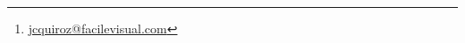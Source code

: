 
\author{Juan Carlos Quiroz\thanks{\href{mailto:jcquiroz@facilevisual.com}{jcquiroz@facilevisual.com}}}
